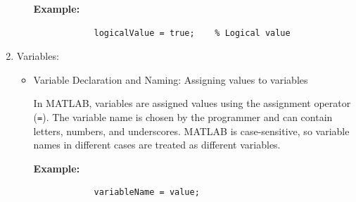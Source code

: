 \documentclass[
11pt, %
a4paper, %
oneside, %
headinclude,footinclude, %
BCOR5mm, %
]{scrartcl}
\begin{document}
\begin{enumerate}
\begin{itemize}
		\textbf{Example:}
		\begin{verbatim}
			logicalValue = true;    % Logical value
		\end{verbatim}
	\end{itemize}
	
	\item Variables:
	\begin{itemize}
		\item Variable Declaration and Naming: Assigning values to variables
		
		In MATLAB, variables are assigned values using the assignment operator (\texttt{=}). The variable name is chosen by the programmer and can contain letters, numbers, and underscores. MATLAB is case-sensitive, so variable names in different cases are treated as different variables.
		
		\textbf{Example:}
		\begin{verbatim}
			variableName = value;
		\end{verbatim}
	\end{itemize}
\end{enumerate}
\end{document}
